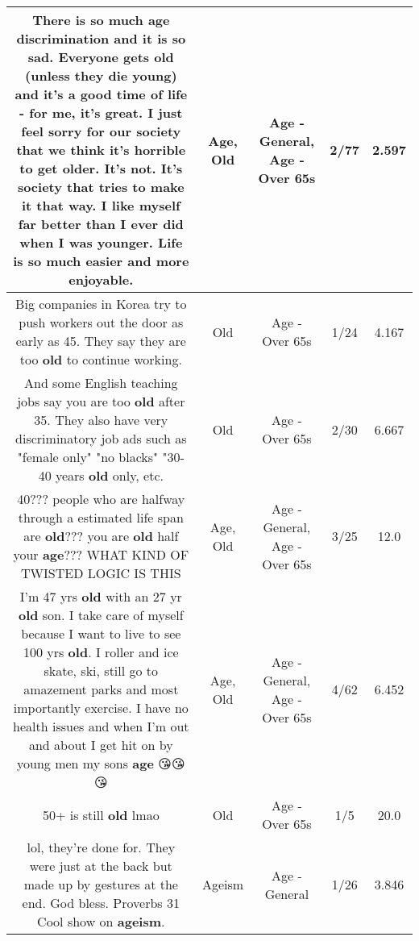 \documentclass[11pt]{article}
\newlength\mylength
\begin{document}
\begin{center}
\begin{longtable}{|C{.65\mylength}|C{.30\mylength}|C{.12\mylength}|C{.12\mylength}|C{.12\mylength}|}
  \small There is so much \textbf{age} discrimination and it is so sad. Everyone gets \textbf{old} (unless they die young) and it's a good time of life - for me, it's great. I just feel sorry for our society that we think it's horrible to get older. It's not. It's society that tries to make it that way. I like myself far better than I ever did when I was younger. Life is so much easier and more enjoyable.\normalsize   & Age, Old & Age - General, Age - Over 65s & 2/77 & 2.597 \\  \hline
  \small Big companies in Korea try to push workers out the door as early as 45.  They say they are too \textbf{old} to continue working.\normalsize   & Old & Age - Over 65s & 1/24 & 4.167 \\  \hline
  \small And some English teaching jobs say you are too \textbf{old} after 35.  They also have very discriminatory job ads such as "female only" "no blacks" "30-40 years \textbf{old} only, etc.\normalsize   & Old & Age - Over 65s & 2/30 & 6.667 \\  \hline
  \small 40??? people who are halfway through a estimated life span are \textbf{old}??? you are \textbf{old} half your \textbf{age}??? WHAT KIND OF TWISTED LOGIC IS THIS\normalsize   & Age, Old & Age - General, Age - Over 65s & 3/25 & 12.0 \\  \hline
  \small I'm 47 yrs \textbf{old} with an 27 yr \textbf{old} son. I take care of myself because I want to live to see 100 yrs \textbf{old}. I roller and ice skate, ski, still go to amazement parks and most importantly exercise. I have no health issues and when I'm out and about I get hit on by young men my sons \textbf{age} 😘😘😘\normalsize   & Age, Old & Age - General, Age - Over 65s & 4/62 & 6.452 \\  \hline
  \small 50+ is still \textbf{old} lmao\normalsize   & Old & Age - Over 65s & 1/5 & 20.0 \\  \hline
  \small lol, they're done for. They were just at the back but made up by gestures at the end. God bless. Proverbs 31 Cool show on \textbf{ageism}.\normalsize   & Ageism & Age - General & 1/26 & 3.846 \\  \hline

\end{longtable}
\end{center}
\end{document}
